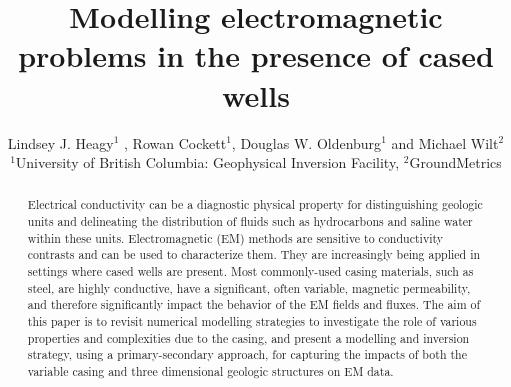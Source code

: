 \documentclass{segabs}
\begin{document}
\title{Modelling electromagnetic problems in the presence of cased wells} %

\author{Lindsey J. Heagy$^1$ \footnotemark[1], Rowan Cockett$^1$, Douglas W. Oldenburg$^1$ and Michael Wilt$^2$ \\ $^1$University of British Columbia: Geophysical Inversion Facility, $^2$GroundMetrics}


\maketitle

\begin{abstract}
	Electrical conductivity can be a diagnostic physical property for distinguishing geologic units and delineating the distribution of fluids such as hydrocarbons and saline water within these units. Electromagnetic (EM) methods are sensitive to conductivity contrasts and can be used to characterize them. They are increasingly being applied in settings where cased wells are present. Most commonly-used casing materials, such as steel, are highly conductive, have a significant, often variable, magnetic permeability, and therefore significantly impact the behavior of the EM fields and fluxes. The aim of this paper is to revisit numerical modelling strategies to investigate the role of various properties and complexities due to the casing, and present a modelling and inversion strategy, using a primary-secondary approach, for capturing the impacts of both the variable casing and three dimensional geologic structures on EM data.
\end{abstract}

\end{document}
